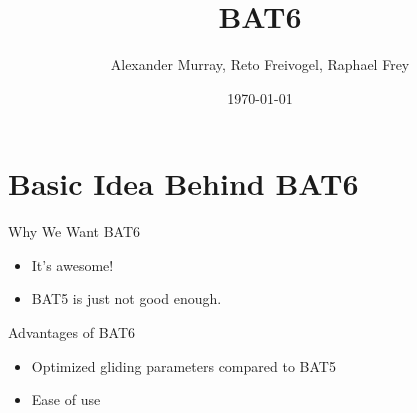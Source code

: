 \documentclass{beamer}
\title{BAT6}
\date{\today}
\author{Alexander Murray, Reto Freivogel, Raphael Frey}
\institute{FHNW Brugg-Windisch}
\begin{document}
  \maketitle

  \section{Basic Idea Behind BAT6}


  \begin{frame}{Why We Want BAT6}
      \begin{itemize}
          \item
              It's awesome!
          \item
              BAT5 is just not good enough.
      \end{itemize}
  \end{frame}

  \begin{frame}{Advantages of BAT6}
      \begin{itemize}
          \item
              Optimized gliding parameters compared to BAT5
          \item
              Ease of use
      \end{itemize}
  \end{frame}
\end{document}
